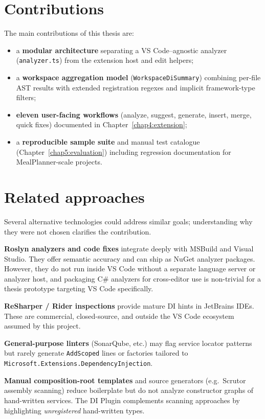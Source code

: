 \section{Contributions}
\label{chap1:contributions}

The main contributions of this thesis are:
\begin{itemize}
	\item a \textbf{modular architecture} separating a VS Code--agnostic analyzer (\texttt{analyzer.ts}) from the extension host and edit helpers;
	\item a \textbf{workspace aggregation model} (\texttt{WorkspaceDiSummary}) combining per-file AST results with extended registration regexes and implicit framework-type filters;
	\item \textbf{eleven user-facing workflows} (analyze, suggest, generate, insert, merge, quick fixes) documented in Chapter~\ref{chap4:extension};
	\item a \textbf{reproducible sample suite} and manual test catalogue (Chapter~\ref{chap5:evaluation}) including regression documentation for MealPlanner-scale projects.
\end{itemize}

\section{Related approaches}
\label{chap1:related}

Several alternative technologies could address similar goals; understanding why they were not chosen clarifies the contribution.

\textbf{Roslyn analyzers and code fixes} integrate deeply with MSBuild and Visual Studio. They offer semantic accuracy and can ship as NuGet analyzer packages. However, they do not run inside VS Code without a separate language server or analyzer host, and packaging C\# analyzers for cross-editor use is non-trivial for a thesis prototype targeting VS Code specifically.

\textbf{ReSharper / Rider inspections} provide mature DI hints in JetBrains IDEs. These are commercial, closed-source, and outside the VS Code ecosystem assumed by this project.

\textbf{General-purpose linters} (SonarQube, etc.) may flag service locator patterns but rarely generate \texttt{AddScoped} lines or factories tailored to \texttt{Microsoft.Extensions.DependencyInjection}.

\textbf{Manual composition-root templates} and source generators (e.g.\ Scrutor assembly scanning) reduce boilerplate but do not analyze constructor graphs of hand-written services. The DI Plugin complements scanning approaches by highlighting \emph{unregistered} hand-written types.

